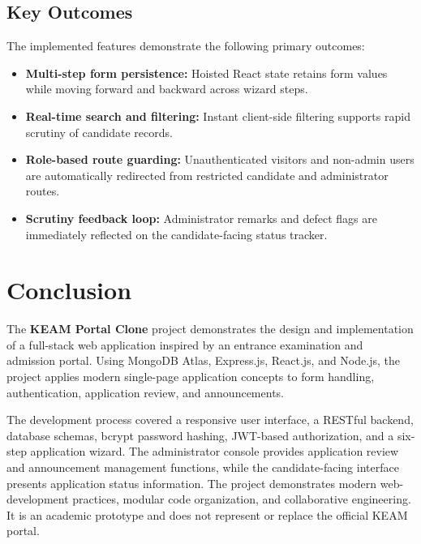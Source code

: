 \documentclass[12pt,a4paper,oneside]{report}
\begin{document}
\section{Key Outcomes}
The implemented features demonstrate the following primary outcomes:
\begin{itemize}
    \item \textbf{Multi-step form persistence:} Hoisted React state retains form values while moving forward and backward across wizard steps.
    \item \textbf{Real-time search and filtering:} Instant client-side filtering supports rapid scrutiny of candidate records.
    \item \textbf{Role-based route guarding:} Unauthenticated visitors and non-admin users are automatically redirected from restricted candidate and administrator routes.
    \item \textbf{Scrutiny feedback loop:} Administrator remarks and defect flags are immediately reflected on the candidate-facing status tracker.
\end{itemize}

\chapter{Conclusion}

The \textbf{KEAM Portal Clone} project demonstrates the design and implementation of a full-stack web application inspired by an entrance examination and admission portal. Using MongoDB Atlas, Express.js, React.js, and Node.js, the project applies modern single-page application concepts to form handling, authentication, application review, and announcements.

The development process covered a responsive user interface, a RESTful backend, database schemas, bcrypt password hashing, JWT-based authorization, and a six-step application wizard. The administrator console provides application review and announcement management functions, while the candidate-facing interface presents application status information. The project demonstrates modern web-development practices, modular code organization, and collaborative engineering. It is an academic prototype and does not represent or replace the official KEAM portal.

\end{document}
